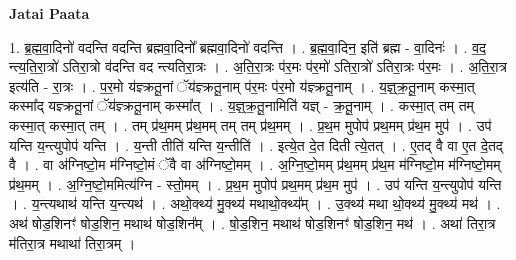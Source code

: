 \documentclass[17pt]{extarticle}
\begin{document}
\textbf{Jatai Paata} \newline

1. ब्र॒ह्म॒वा॒दिनो॑ वदन्ति वदन्ति ब्रह्मवा॒दिनो᳚ ब्रह्मवा॒दिनो॑ वदन्ति । . ब्र॒ह्म॒वा॒दिन॒ इति॑ ब्रह्म - वा॒दिनः॑ । . व॒द॒ न्त्य॒ति॒रा॒त्रो॑ ऽतिरा॒त्रो व॑दन्ति वद न्त्यतिरा॒त्रः । . अ॒ति॒रा॒त्रः प॑र॒मः प॑र॒मो॑ ऽतिरा॒त्रो॑ ऽतिरा॒त्रः प॑र॒मः । . अ॒ति॒रा॒त्र इत्य॑ति - रा॒त्रः । . प॒र॒मो य॑ज्ञ्क्रतू॒नां ॅय॑ज्ञ्क्रतू॒नाम् प॑र॒मः प॑र॒मो य॑ज्ञ्क्रतू॒नाम् । . य॒ज्ञ्॒क्र॒तू॒नाम् कस्मा॒त् कस्मा᳚द् यज्ञ्क्रतू॒नां ॅय॑ज्ञ्क्रतू॒नाम् कस्मा᳚त् । . य॒ज्ञ्॒क्र॒तू॒नामिति॑ यज्ञ् - क्र॒तू॒नाम् । . कस्मा॒त् तम् तम् कस्मा॒त् कस्मा॒त् तम् । . तम् प्र॑थ॒मम् प्र॑थ॒मम् तम् तम् प्र॑थ॒मम् । . प्र॒थ॒म मुपोप॑ प्रथ॒मम् प्र॑थ॒म मुप॑ । . उप॑ यन्ति य॒न्त्युपोप॑ यन्ति । . य॒न्ती तीति॑ यन्ति य॒न्तीति॑ । . इत्ये॒त दे॒त दिती त्ये॒तत् । . ए॒तद् वै वा ए॒त दे॒तद् वै । . वा अ॑ग्निष्टो॒म म॑ग्निष्टो॒मं ॅवै वा अ॑ग्निष्टो॒मम् । . अ॒ग्नि॒ष्टो॒मम् प्र॑थ॒मम् प्र॑थ॒म म॑ग्निष्टो॒म म॑ग्निष्टो॒मम् प्र॑थ॒मम् । . अ॒ग्नि॒ष्टो॒ममित्य॑ग्नि - स्तो॒मम् । . प्र॒थ॒म मुपोप॑ प्रथ॒मम् प्र॑थ॒म मुप॑ । . उप॑ यन्ति य॒न्त्युपोप॑ यन्ति । . य॒न्त्यथाथ॑ यन्ति य॒न्त्यथ॑ । . अथो॒क्थ्य॑ मु॒क्थ्य॑ मथाथो॒क्थ्य᳚म् । . उ॒क्थ्य॑ मथा थो॒क्थ्य॑ मु॒क्थ्य॑ मथ॑ । . अथ॑ षोड॒शिनꣳ॑ षोड॒शिन॒ मथाथ॑ षोड॒शिन᳚म् । . षो॒ड॒शिन॒ मथाथ॑ षोड॒शिनꣳ॑ षोड॒शिन॒ मथ॑ । . अथा॑ तिरा॒त्र म॑तिरा॒त्र मथाथा॑ तिरा॒त्रम् । \newline
\end{document}
